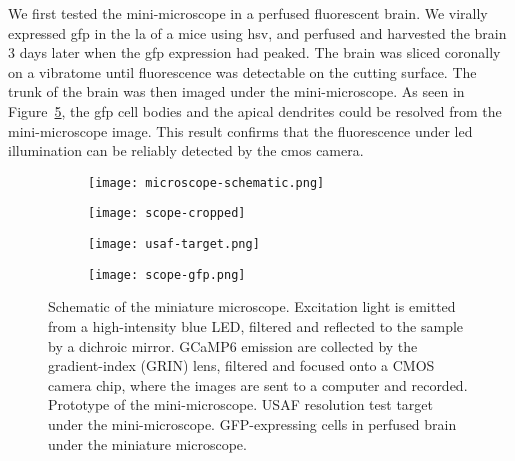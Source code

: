 We first tested the mini-microscope in a perfused fluorescent brain. We virally expressed \gls{gfp} in the \gls{la} of a mice using \gls{hsv}, and perfused and harvested the brain 3 days later when the \gls{gfp} expression had peaked. The brain was sliced coronally on a vibratome until fluorescence was detectable on the cutting surface. The trunk of the brain was then imaged under the mini-microscope. As seen in Figure~\ref{f.scope-gfp}, the \gls{gfp} cell bodies and the apical dendrites could be resolved from the mini-microscope image. This result confirms that the fluorescence under  \gls{led} illumination can be reliably detected by the \gls{cmos} camera.

\begin{figure}[h]
    \begin{subfigure}[t]{.55\textwidth}
        \centering
        \texttt{[image: microscope-schematic.png]}
        \caption{\label{f.scope-schema}}
    \end{subfigure}
    \begin{subfigure}[t]{.45\textwidth}
        \centering
        \texttt{[image: scope-cropped]}
        \caption{\label{f.scope}}
    \end{subfigure}
    \begin{subfigure}[t]{.5\textwidth}
        \centering
        \texttt{[image: usaf-target.png]}
        \caption{\label{f.usaf}}
    \end{subfigure}
    \begin{subfigure}[t]{.5\textwidth}
        \centering
        \texttt{[image: scope-gfp.png]}
        \caption{\label{f.scope-gfp}}
    \end{subfigure}
    \caption[Schematic of the miniature microscope.]{ Schematic of the miniature microscope. Excitation light is emitted from a high-intensity blue LED, filtered and reflected to the sample by a dichroic mirror. GCaMP6 emission are collected by the gradient-index (GRIN) lens, filtered and focused onto a CMOS camera chip, where the images are sent to a computer and recorded. 
              Prototype of the mini-microscope.
              USAF resolution test target under the mini-microscope.
              GFP-expressing cells in perfused brain under the miniature microscope.}
\end{figure}


